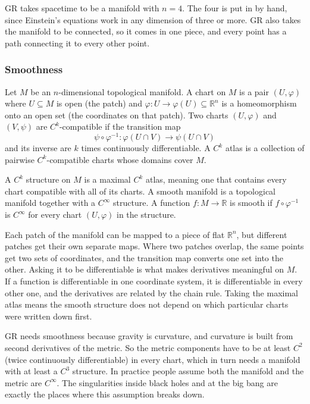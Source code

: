 GR takes spacetime to be a manifold with $n=4$.
The four is put in by hand, since Einstein's equations work in any dimension of three or more.
GR also takes the manifold to be connected, so it comes in one piece, and every point has a path connecting it to every other point.

\subsubsection{Smoothness}

\begin{definition}
Let $M$ be an $n$-dimensional topological manifold.
A chart on $M$ is a pair $(U,\varphi)$ where $U\subseteq M$ is open (the patch) and $\varphi:U\to\varphi(U)\subseteq\mathbb{R}^n$ is a homeomorphism onto an open set (the coordinates on that patch).
Two charts $(U,\varphi)$ and $(V,\psi)$ are $C^k$-compatible if the transition map
\[
  \psi\circ\varphi^{-1}:\varphi(U\cap V)\to\psi(U\cap V)
\]
and its inverse are $k$ times continuously differentiable.
A $C^k$ atlas is a collection of pairwise $C^k$-compatible charts whose domains cover $M$.
\end{definition}

\begin{definition}
A $C^k$ structure on $M$ is a maximal $C^k$ atlas, meaning one that contains every chart compatible with all of its charts.
A smooth manifold is a topological manifold together with a $C^\infty$ structure.
A function $f:M\to\mathbb{R}$ is smooth if $f\circ\varphi^{-1}$ is $C^\infty$ for every chart $(U,\varphi)$ in the structure.
\end{definition}

Each patch of the manifold can be mapped to a piece of flat $\mathbb{R}^n$, but different patches get their own separate maps.
Where two patches overlap, the same points get two sets of coordinates, and the transition map converts one set into the other.
Asking it to be differentiable is what makes derivatives meaningful on $M$.
If a function is differentiable in one coordinate system, it is differentiable in every other one, and the derivatives are related by the chain rule.
Taking the maximal atlas means the smooth structure does not depend on which particular charts were written down first.

GR needs smoothness because gravity is curvature, and curvature is built from second derivatives of the metric.
So the metric components have to be at least $C^2$ (twice continuously differentiable) in every chart, which in turn needs a manifold with at least a $C^3$ structure.
In practice people assume both the manifold and the metric are $C^\infty$.
The singularities inside black holes and at the big bang are exactly the places where this assumption breaks down.


